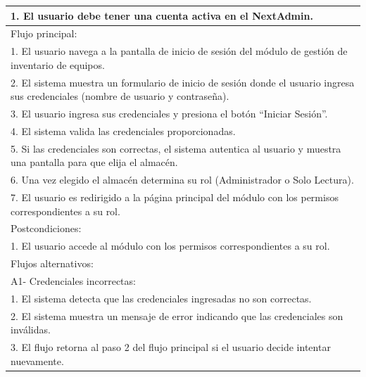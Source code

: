 \documentclass[stu, 12pt, letterpaper, donotrepeattitle, floatsintext, natbib]{apa7}
\begin{document}
\begin{longtable}{@{} p{16.5cm} @{}}
    1. El usuario debe tener una cuenta activa en el NextAdmin.                                                                         \\ \midrule
    Flujo principal:                                                                                                                    \\
    1. El usuario navega a la pantalla de inicio de sesión del módulo de gestión de inventario de equipos.                              \\
    2. El sistema muestra un formulario de inicio de sesión donde el usuario ingresa sus credenciales (nombre de usuario y contraseña). \\
    3. El usuario ingresa sus credenciales y presiona el botón ``Iniciar Sesión''.                                                      \\
    4. El sistema valida las credenciales proporcionadas.                                                                               \\
    5. Si las credenciales son correctas, el sistema autentica al usuario y muestra una pantalla para que elija el almacén.             \\
    6. Una vez elegido el almacén determina su rol (Administrador o Solo Lectura).                                                      \\
    7. El usuario es redirigido a la página principal del módulo con los permisos correspondientes a su rol.                            \\ \midrule
    Postcondiciones:                                                                                                                    \\
    1. El usuario accede al módulo con los permisos correspondientes a su rol.                                                          \\ \midrule
    Flujos alternativos:                                                                                                                \\
    A1- Credenciales incorrectas:                                                                                                       \\
    \hspace{1cm}1. El sistema detecta que las credenciales ingresadas no son correctas.                                                 \\
    \hspace{1cm}2. El sistema muestra un mensaje de error indicando que las credenciales son inválidas.                                 \\
    \hspace{1cm}3. El flujo retorna al paso 2 del flujo principal si el usuario decide intentar nuevamente.                             \\ \bottomrule
\end{longtable}
\end{document}
